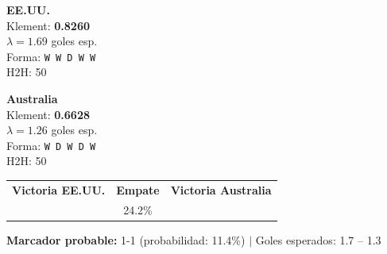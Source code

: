 \documentclass[11pt,a4paper]{article}
\begin{document}
\begin{tcolorbox}[colback=yellow!5, colframe=yellow!60!black, arc=5pt, 
  title={\textbf{Grupo D: EE.UU. \textbf{vs} Australia}}]

\begin{minipage}{0.48\textwidth}
  \centering
  {\Large\bfseries EE.UU.}\\[3pt]
  Klement: \textbf{0.8260} \\
  $\lambda = 1.69$ goles esp. \\
  Forma: \texttt{W W D W W}\\ 
  H2H: 50%
\end{minipage}
\hfill
\begin{minipage}{0.04\textwidth}
\end{minipage}
\hfill
\begin{minipage}{0.48\textwidth}
  \centering
  {\Large\bfseries Australia}\\[3pt]
  Klement: \textbf{0.6628} \\
  $\lambda = 1.26$ goles esp. \\
  Forma: \texttt{W D W D W}\\ 
  H2H: 50%
\end{minipage}

\vspace{0.4cm}
\centering
\begin{tabular}{ccc}
  \textbf{Victoria EE.UU.} & \textbf{Empate} & \textbf{Victoria Australia} \\[3pt]
  \cellcolor{yellow!25}{\LARGE\bfseries 47.0\%}
  & {\LARGE 24.2\%}
  & \cellcolor{red!25}{\LARGE\bfseries 28.7\%} \\
\end{tabular}

\vspace{0.3cm}
\textbf{Marcador probable:} 1-1 (probabilidad: 11.4\%)
\quad $|$ \quad Goles esperados: 1.7 -- 1.3
\end{tcolorbox}
\end{document}
